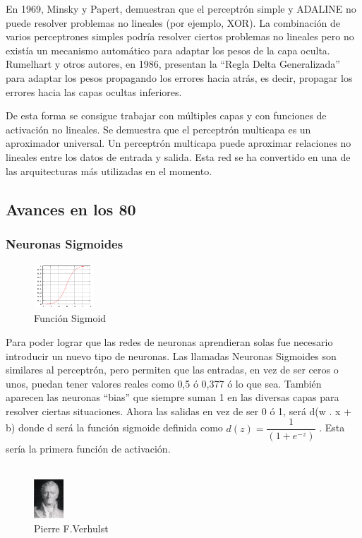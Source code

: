 \documentclass[a4paper]{article}
\begin{document}
En 1969, Minsky y Papert, demuestran que el perceptrón simple y 
ADALINE no puede resolver problemas no lineales (por ejemplo, 
XOR). La combinación de varios perceptrones simples podría 
resolver ciertos problemas no lineales pero no existía un 
mecanismo automático para adaptar los pesos de la capa oculta. 
Rumelhart y otros autores, en 1986, presentan la ``Regla Delta 
Generalizada'' para adaptar los pesos propagando los errores hacia 
atrás, es decir, propagar los errores hacia las capas ocultas 
inferiores.


De esta forma se consigue trabajar con múltiples capas y con 
funciones de activación no lineales. Se demuestra que el 
perceptrón multicapa es un aproximador universal. Un perceptrón 
multicapa puede aproximar relaciones no lineales entre los datos 
de entrada y salida. Esta red se ha convertido en una de las 
arquitecturas más utilizadas en el momento.

\subsection{Avances en los 80}

\subsubsection{Neuronas Sigmoides}
\begin{figure} %
    \centering
    \includegraphics[width=0.2\textwidth]{./images/Logistic-curve.png}
    \caption{Función Sigmoid}
\end{figure}

Para poder lograr que las redes de neuronas aprendieran solas fue 
necesario introducir un nuevo tipo de neuronas. Las llamadas 
Neuronas Sigmoides son similares al perceptrón, pero permiten que 
las entradas, en vez de ser ceros o unos, puedan tener valores 
reales como 0,5 ó 0,377 ó lo que sea. También aparecen las 
neuronas ``bias'' que siempre suman 1 en las diversas capas para 
resolver ciertas situaciones. Ahora las salidas en vez de ser 0 ó 
1, será d(w . x + b) donde d será la función sigmoide definida 
como $d(z) = \dfrac{1}{( 1 +e^{-z})}$ . Esta sería la primera 
función de activación.
\\
\\
\begin{figure} %
    \centering
    \includegraphics[width=0.1\textwidth]{./images/Pierre_Francois.jpeg}
    \caption{Pierre F.Verhulst}
\end{figure}
\end{document}
